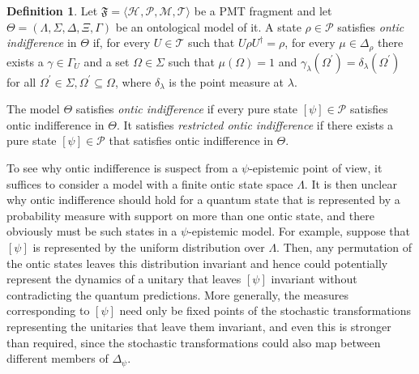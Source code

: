 \documentclass[DIV=calc,paper=a4,fontsize=11pt,twocolumn]{scrartcl} %
\theoremstyle{definition}
\newtheorem{definition}{Definition}[section]
\theoremstyle{plain}
\newcommand{\Proj}[1]{\ensuremath{\left [ #1 \right ]}}
\newcommand{\Hilb}[1][]{\ensuremath{\mathcal{H}_{#1}}}
\begin{document}
\begin{definition}
Let $\mathfrak{F} = \langle \Hilb, \mathcal{P}, \mathcal{M},
\mathcal{T} \rangle$ be a PMT fragment and let $\Theta = \left (
\Lambda, \Sigma, \Delta, \Xi, \Gamma \right )$ be an ontological
model of it.  A state $\rho \in \mathcal{P}$ satisfies \emph{ontic
indifference} in $\Theta$ if, for every $U \in \mathcal{T}$ such that
$U \rho U^{\dagger} = \rho$, for every $\mu \in \Delta_{\rho}$ there
exists a $\gamma \in \Gamma_U$ and a set $\Omega \in \Sigma$ such
that $\mu(\Omega) = 1$ and $\gamma_{\lambda}(\Omega^{\prime}) =
\delta_{\lambda}(\Omega^{\prime})$ for all $\Omega^{\prime} \in
\Sigma, \Omega^{\prime} \subseteq \Omega$, where $\delta_{\lambda}$
is the point measure at $\lambda$.

The model $\Theta$ satisfies \emph{ontic indifference} if every pure
state $\Proj{\psi} \in \mathcal{P}$ satisfies ontic indifference in
$\Theta$.  It satisfies \emph{restricted ontic indifference} if there
exists a pure state $\Proj{\psi} \in \mathcal{P}$ that satisfies
ontic indifference in $\Theta$.
\end{definition}

To see why ontic indifference is suspect from a $\psi$-epistemic point
of view, it suffices to consider a model with a finite ontic state
space $\Lambda$.  It is then unclear why ontic indifference should
hold for a quantum state that is represented by a probability measure
with support on more than one ontic state, and there obviously must be
such states in a $\psi$-epistemic model.  For example, suppose that
$\Proj{\psi}$ is represented by the uniform distribution over
$\Lambda$.  Then, any permutation of the ontic states leaves this
distribution invariant and hence could potentially represent the
dynamics of a unitary that leaves $\Proj{\psi}$ invariant without
contradicting the quantum predictions.  More generally, the measures
corresponding to $\Proj{\psi}$ need only be fixed points of the
stochastic transformations representing the unitaries that leave them
invariant, and even this is stronger than required, since the
stochastic transformations could also map between different members of
$\Delta_{\psi}$.
\end{document}
